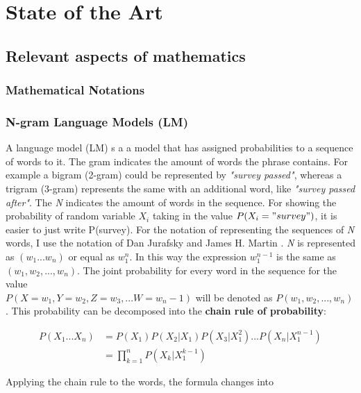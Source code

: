 \chapter{State of the Art}\label{ch:data}

\section{Relevant aspects of mathematics}

\subsection{Mathematical Notations}

\subsection{N-gram Language Models (LM)}
A language model (LM) s a a model that has assigned probabilities to a sequence of words to it. The gram indicates the amount of words the phrase contains. For example a bigram (2-gram) could be represented by \textit{"survey passed"}, whereas a trigram (3-gram) represents the same with an additional word, like \textit{"survey passed after"}. The \textit{N} indicates the amount of words in the sequence. For showing the probability of random variable \(X_i\) taking in the value  \(P(X_i = "survey")\), it is easier to just write P(survey). For the notation of representing the sequences of \textit{N} words, I use the notation of Dan Jurafsky and James H. Martin \cite{LM}. \textit{N} is represented as \((w_1 ... w_n)\) or equal as \(w_1^{n}\). In this way the expression \(w_1^{n-1}\) is the same as \((w_1, w_2, ... , w_n)\). The joint probability for every word in the sequence for the value \\
\( P(X = w_1, Y = w_2, Z = w_3, ... W = w_n-1) \) will be denoted as \( P(w_1, w_2, ... , w_n) \). This probability can be decomposed into the \textbf{chain rule of probability}:

% 

\begin{equation}
\begin{split}
P(X_1 ... X_n) & = P(X_1)P(X_2|X_1)P(X_3|X_1^{2})...P(X_n|X_1^{n-1}) \\
& = \prod_{k=1}^{n} P(X_k|X_1^{k-1})
\end{split}
\end{equation}

Applying the chain rule to the words, the formula changes into \cite{LM}

